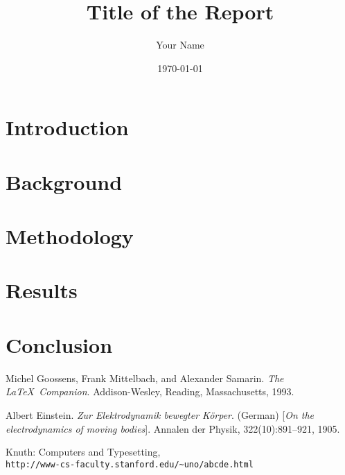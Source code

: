 \documentclass{report}
\title{Title of the Report}
\author{Your Name}
\date{\today}
\begin{document}
\maketitle

\tableofcontents

\chapter{Introduction}
\lipsum[1-2]

\chapter{Background}
\lipsum[3-4]

\chapter{Methodology}
\lipsum[5-6]

\chapter{Results}
\lipsum[7-8]

\chapter{Conclusion}
\lipsum[9-10]

\begin{thebibliography}{9}
Michel Goossens, Frank Mittelbach, and Alexander Samarin. 
\textit{The \LaTeX\ Companion}. 
Addison-Wesley, Reading, Massachusetts, 1993.

Albert Einstein. 
\textit{Zur Elektrodynamik bewegter K{\"o}rper}. (German) 
[\textit{On the electrodynamics of moving bodies}]. 
Annalen der Physik, 322(10):891–921, 1905.

Knuth: Computers and Typesetting,
\\\texttt{http://www-cs-faculty.stanford.edu/\~{}uno/abcde.html}
\end{thebibliography}
\end{document}
